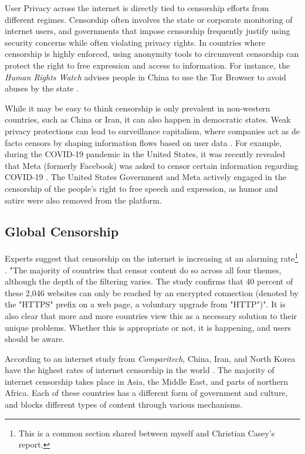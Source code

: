 User Privacy across the internet is directly tied to censorship efforts from different regimes. Censorship often involves the state or corporate monitoring of internet users, and governments that impose censorship frequently justify using security concerns while often violating privacy rights. In countries where censorship is highly enforced, using anonymity tools to circumvent censorship can protect the right to free expression and access to information. For instance, the \textit{Human Rights Watch} advises people in China to use the Tor Browser to avoid abuses by the state \cite{Privacy2017}.

While it may be easy to think censorship is only prevalent in non-western countries, such as China or Iran, it can also happen in democratic states. Weak privacy protections can lead to surveillance capitalism, where companies act as de facto censors by shaping information flows based on user data \cite{schwartz1999internet}. For example, during the COVID-19 pandemic in the United States, it was recently revealed that Meta (formerly Facebook) was asked to censor certain information regarding COVID-19 \cite{pbsZuckerbergSays}. The United States Government and Meta actively engaged in the censorship of the people's right to free speech and expression, as humor and satire were also removed from the platform.

\subsection{Global Censorship}
\label{sec:Chris-Global-Censorship}

Experts suggest that censorship on the internet is increasing at an alarming rate\footnote{This is a common section shared between myself and Christian Casey’s report.}  \cite{zittrain2017shifting}. "The majority of countries that censor content do so across all four themes, although the depth of the filtering varies. The study confirms that 40 percent of these 2,046 websites can only be reached by an encrypted connection (denoted by the "HTTPS" prefix on a web page, a voluntary upgrade from "HTTP")". It is also clear that more and more countries view this as a necessary solution to their unique problems. Whether this is appropriate or not, it is happening, and users should be aware.  

According to an internet study from \textit{Comparitech}, China, Iran, and North Korea have the highest rates of internet censorship in the world \cite{comparitechInternetCensorship}. The majority of internet censorship takes place in Asia, the Middle East, and parts of northern Africa. Each of these countries has a different form of government and culture, and blocks different types of content through various mechanisms. 



